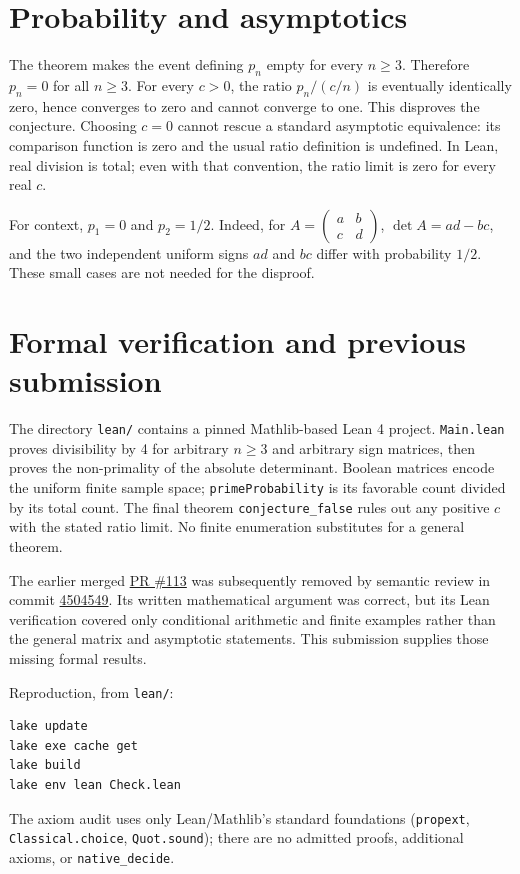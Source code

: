 \documentclass[11pt]{article}
\begin{document}
\section{Probability and asymptotics}
The theorem makes the event defining $p_n$ empty for every $n\ge3$.
Therefore $p_n=0$ for all $n\ge3$. For every $c>0$, the ratio $p_n/(c/n)$
is eventually identically zero, hence converges to zero and cannot converge
to one. This disproves the conjecture. Choosing $c=0$ cannot rescue a standard
asymptotic equivalence: its comparison function is zero and the usual ratio
definition is undefined. In Lean, real division is total; even with that
convention, the ratio limit is zero for every real $c$.

For context, $p_1=0$ and $p_2=1/2$. Indeed, for
$A=\left(\begin{smallmatrix}a&b\\c&d\end{smallmatrix}\right)$,
$\det A=ad-bc$, and the two independent uniform signs $ad$ and $bc$ differ
with probability $1/2$. These small cases are not needed for the disproof.

\section{Formal verification and previous submission}
The directory \texttt{lean/} contains a pinned Mathlib-based Lean 4 project.
\texttt{Main.lean} proves divisibility by 4 for arbitrary $n\ge3$ and
arbitrary sign matrices, then proves the non-primality of the absolute
determinant. Boolean matrices encode the uniform finite sample space;
\texttt{primeProbability} is its favorable count divided by its total count.
The final theorem \texttt{conjecture\_false} rules out any positive $c$ with
the stated ratio limit. No finite enumeration substitutes for a general theorem.

The earlier merged
\href{https://github.com/The-Last-Math-Competition/The-Last-Math-Competition/pull/113}{PR \#113}
was subsequently removed by semantic review in commit
\href{https://github.com/The-Last-Math-Competition/The-Last-Math-Competition/commit/450454963d8a4a512a25c3bb9c8654e5c2da40f7}{4504549}.
Its written mathematical argument was correct, but its Lean verification
covered only conditional arithmetic and finite examples rather than the
general matrix and asymptotic statements. This submission supplies those
missing formal results.

\medskip\noindent Reproduction, from \texttt{lean/}:
\begin{verbatim}
lake update
lake exe cache get
lake build
lake env lean Check.lean
\end{verbatim}
The axiom audit uses only Lean/Mathlib's standard foundations
(\texttt{propext}, \texttt{Classical.choice}, \texttt{Quot.sound});
there are no admitted proofs, additional axioms, or \texttt{native\_decide}.
\end{document}
